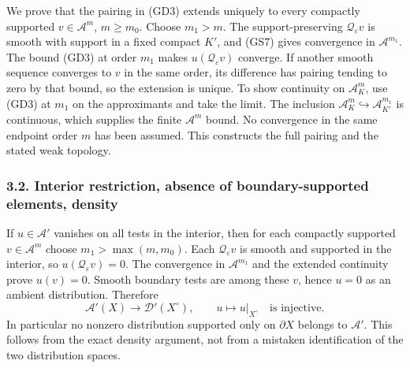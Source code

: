 \documentclass[
  11pt,
]{article}
\begin{document}
We prove that the pairing in (GD3) extends uniquely to every compactly
supported \(v\in\mathcal A^m\), \(m\ge m_0\). Choose \(m_1>m\). The
support-preserving \(\mathcal Q_\varepsilon v\) is smooth with support
in a fixed compact \(K'\), and (GS7) gives convergence in
\(\mathcal A^{m_1}\). The bound (GD3) at order \(m_1\) makes
\(u(\mathcal Q_\varepsilon v)\) converge. If another smooth sequence
converges to \(v\) in the same order, its difference has pairing tending
to zero by that bound, so the extension is unique. To show continuity on
\(\mathcal A^m_K\), use (GD3) at \(m_1\) on the approximants and take
the limit. The inclusion
\(\mathcal A^m_K\hookrightarrow\mathcal A^{m_1}_{K'}\) is continuous,
which supplies the finite \(\mathcal A^m\) bound. No convergence in the
same endpoint order \(m\) has been assumed. This constructs the full
pairing and the stated weak topology.

\subsubsection{3.2. Interior restriction, absence of boundary-supported
elements,
density}\label{interior-restriction-absence-of-boundary-supported-elements-density}

If \(u\in\mathcal A'\) vanishes on all tests in the interior, then for
each compactly supported \(v\in\mathcal A^m\) choose
\(m_1>\max(m,m_0)\). Each \(\mathcal Q_\varepsilon v\) is smooth and
supported in the interior, so \(u(\mathcal Q_\varepsilon v)=0\). The
convergence in \(\mathcal A^{m_1}\) and the extended continuity prove
\(u(v)=0\). Smooth boundary tests are among these \(v\), hence \(u=0\)
as an ambient distribution. Therefore \[
 \mathcal A'(X)\longrightarrow\mathcal D'(X^\circ),
 \qquad u\longmapsto u|_{X^\circ}
 \quad\text{is injective}.
 \tag{GD4}
\] In particular no nonzero distribution supported only on
\(\partial X\) belongs to \(\mathcal A'\). This follows from the exact
density argument, not from a mistaken identification of the two
distribution spaces.
\end{document}
